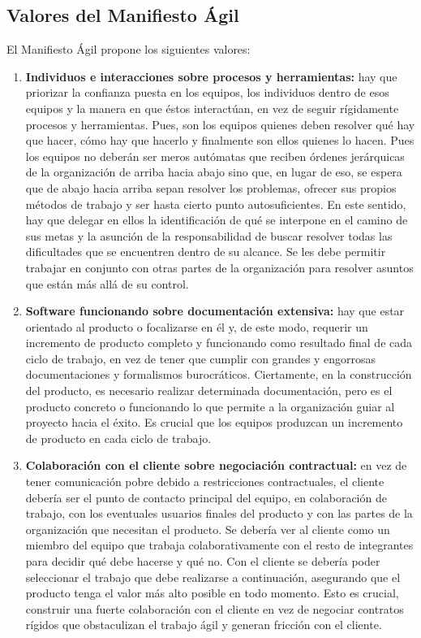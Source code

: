 \subsection{Valores del Manifiesto Ágil}

El Manifiesto Ágil propone los siguientes valores:

\begin{enumerate}

\item \textbf{Individuos e interacciones sobre procesos y herramientas:} hay que priorizar la confianza puesta en los equipos, los individuos dentro de esos equipos y la manera en que éstos interactúan, en vez de seguir rígidamente procesos y herramientas. Pues, son los equipos quienes deben resolver qué hay que hacer, cómo hay que hacerlo y finalmente son ellos quienes lo hacen. Pues los equipos no deberán ser meros autómatas que reciben órdenes jerárquicas de la organización de arriba hacia abajo sino que, en lugar de eso, se espera que de abajo hacia arriba sepan resolver los problemas, ofrecer sus propios métodos de trabajo y ser hasta cierto punto autosuficientes. En este sentido, hay que delegar en ellos la identificación de qué se interpone en el camino de sus metas y la asunción de la responsabilidad de buscar resolver todas las dificultades que se encuentren dentro de su alcance. Se les debe permitir trabajar en conjunto con otras partes de la organización para resolver asuntos que están más allá de su control.

\item \textbf{Software funcionando sobre documentación extensiva:} hay que estar orientado al producto o focalizarse en él y, de este modo, requerir un incremento de producto completo y funcionando como resultado final de cada ciclo de trabajo, en vez de tener que cumplir con grandes y engorrosas documentaciones y formalismos burocráticos. Ciertamente, en la construcción del producto, es necesario realizar determinada documentación, pero es el producto concreto o funcionando lo que permite a la organización guiar al proyecto hacia el éxito. Es crucial que los equipos produzcan un incremento de producto en cada ciclo de trabajo.

\item \textbf{Colaboración con el cliente sobre negociación contractual:} en vez de tener comunicación pobre debido a restricciones contractuales, el cliente debería ser el punto de contacto principal del equipo, en colaboración de trabajo, con los eventuales usuarios finales del producto y con las partes de la organización que necesitan el producto. Se debería ver al cliente como un miembro del equipo que trabaja colaborativamente con el resto de integrantes para decidir qué debe hacerse y qué no. Con el cliente se debería poder seleccionar el trabajo que debe realizarse a continuación, asegurando que el producto tenga el valor más alto posible en todo momento. Esto es crucial, construir una fuerte colaboración con el cliente en vez de negociar contratos rígidos que obstaculizan el trabajo ágil y generan fricción con el cliente.


\end{enumerate}
